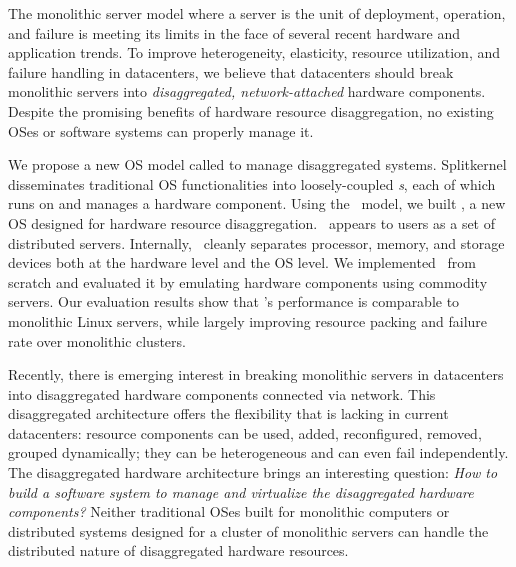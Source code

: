 \documentclass[10pt,times,twocolumn]{z2-article}
\begin{document}
The monolithic server model where a server is the unit of deployment, operation, and failure 
is meeting its limits in the face of several recent hardware and application trends. 
To improve heterogeneity, elasticity, resource utilization, and failure handling in datacenters, 
we believe that datacenters should break monolithic servers into {\em disaggregated, network-attached} hardware components. 
Despite the promising benefits of hardware resource disaggregation, 
no existing OSes or software systems can properly manage it.

We propose a new OS model called {\em \splitkernel} to manage disaggregated systems. 
Splitkernel disseminates traditional OS functionalities into loosely-coupled {\em \microos{}s},
each of which runs on and manages a hardware component.
Using the \splitkernel\ model, we built {\em \lego}, 
a new OS designed for hardware resource disaggregation. 
\lego\ appears to users as a set of distributed servers.
Internally, \lego\ cleanly separates processor, memory, and storage devices 
both at the hardware level and the OS level.
We implemented \lego\ from scratch and evaluated it by emulating hardware components using commodity servers. 
Our evaluation results show that \lego's performance is comparable to monolithic Linux servers,
while largely improving resource packing and failure rate over monolithic clusters.




Recently, there is emerging interest in breaking monolithic servers in datacenters into disaggregated hardware components connected via network.
This disaggregated architecture offers the flexibility that is lacking in current datacenters:
resource components can be used, added, reconfigured, removed, grouped dynamically;
they can be heterogeneous and can even fail independently.
The disaggregated hardware architecture brings an interesting question:
{\em How to build a software system to manage and virtualize the disaggregated hardware components?}
Neither traditional OSes built for monolithic computers or distributed systems designed for a cluster of monolithic servers 
can handle the distributed nature of disaggregated hardware resources. 
\end{document}

